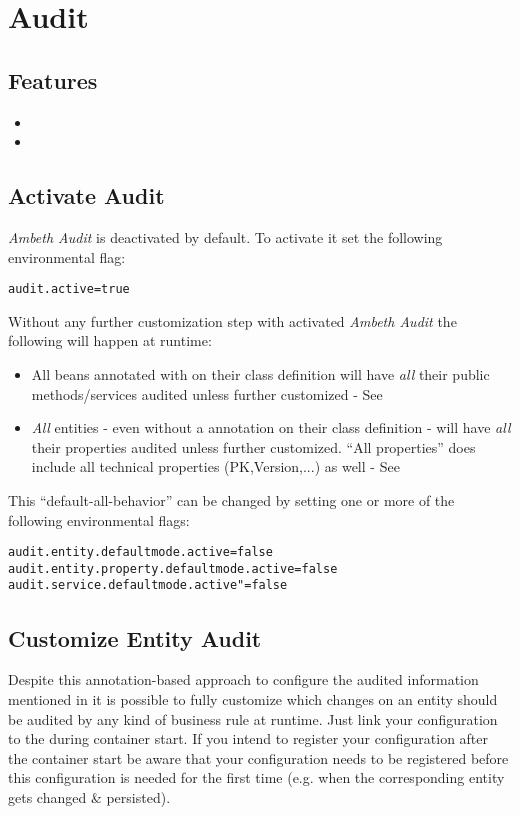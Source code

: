 \section{Audit}
\label{module:Audit}

\subsection{Features}
\begin{itemize}
	\item {}
	\item {}
\end{itemize}

\subsection{Activate Audit}
\textit{Ambeth Audit} is deactivated by default. To activate it set the following environmental flag:
\begin{lstlisting}[style=Props]
audit.active=true
\end{lstlisting}

Without any further customization step with activated \textit{Ambeth Audit} the following will happen at runtime:
\begin{itemize}
	\item All beans annotated with \type{\@Audited} on their class definition will have \emph{all} their public methods/services audited unless further customized - See 
	\item \emph{All} entities - even without a  annotation on their class definition - will have \emph{all} their properties audited unless further customized. ``All properties'' does include all technical properties (PK,Version,...) as well - See 
\end{itemize}

This ``default-all-behavior'' can be changed by setting one or more of the following environmental flags:
\begin{lstlisting}[style=Props]
audit.entity.defaultmode.active=false
audit.entity.property.defaultmode.active=false
audit.service.defaultmode.active"=false
\end{lstlisting}

\subsection{Customize Entity Audit}
Despite this annotation-based approach to configure the audited information mentioned in  it is possible to fully customize which changes on an entity should be audited by any kind of business rule at runtime. Just link your configuration to the  during container start. If you intend to register your configuration after the container start be aware that your configuration needs to be registered before this configuration is needed for the first time (e.g. when the corresponding entity gets changed \& persisted).

